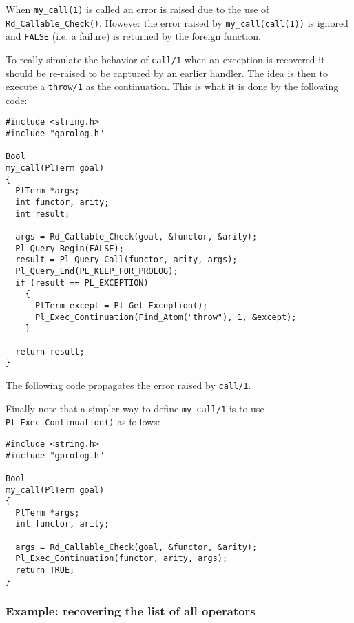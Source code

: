 When \texttt{my\_call(1)} is called an error is raised due to the use of
\texttt{Rd\_Callable\_Check()}. However the error raised by
\texttt{my\_call(call(1))} is ignored and \texttt{FALSE} (i.e. a failure) is
returned by the foreign function. 

To really simulate the behavior of \texttt{call/1} when an exception
is recovered it should be re-raised to be captured by an earlier
handler. The idea is then to execute a \texttt{throw/1} as the
continuation. This is what it is done by the following code:

\begin{Indentation}
\begin{verbatim}
#include <string.h>
#include "gprolog.h"

Bool
my_call(PlTerm goal)
{
  PlTerm *args;
  int functor, arity;
  int result;

  args = Rd_Callable_Check(goal, &functor, &arity);
  Pl_Query_Begin(FALSE);
  result = Pl_Query_Call(functor, arity, args);
  Pl_Query_End(PL_KEEP_FOR_PROLOG);
  if (result == PL_EXCEPTION)
    {
      PlTerm except = Pl_Get_Exception();
      Pl_Exec_Continuation(Find_Atom("throw"), 1, &except);
    }

  return result;
}
\end{verbatim}
\end{Indentation}

The following code propagates the error raised by \texttt{call/1}.

\begin{CodeTwoCols}
\end{CodeTwoCols}

Finally note that a simpler way to define \texttt{my\_call/1} is to use 
\texttt{Pl\_Exec\_Continuation()} as follows:

\begin{Indentation}
\begin{verbatim}
#include <string.h>
#include "gprolog.h"

Bool
my_call(PlTerm goal)
{
  PlTerm *args;
  int functor, arity;

  args = Rd_Callable_Check(goal, &functor, &arity);
  Pl_Exec_Continuation(functor, arity, args);
  return TRUE;
}
\end{verbatim}
\end{Indentation}

\subsubsection{Example: recovering the list of all operators}

